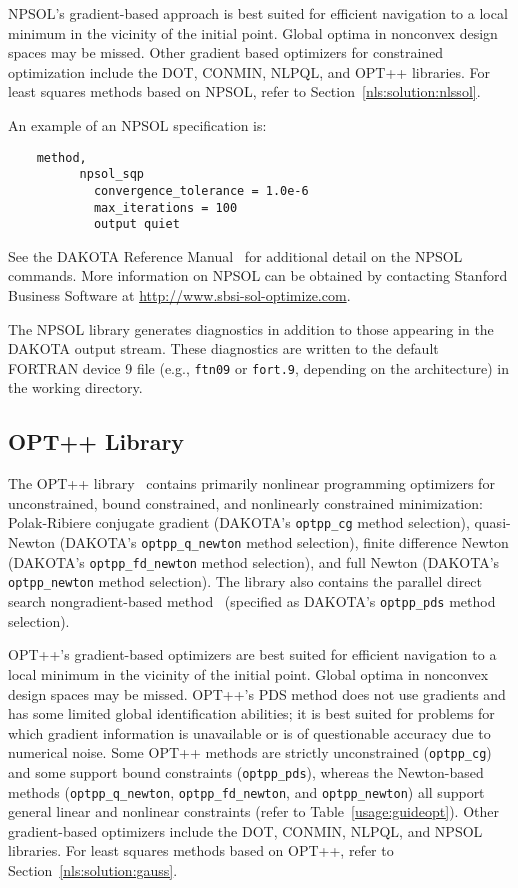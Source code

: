 NPSOL's gradient-based approach is best suited for efficient
navigation to a local minimum in the vicinity of the initial point.
Global optima in nonconvex design spaces may be missed. Other gradient
based optimizers for constrained optimization include the DOT, CONMIN,
NLPQL, and OPT++ libraries. For least squares methods based on NPSOL,
refer to Section~\ref{nls:solution:nlssol}.

An example of an NPSOL specification is:
\begin{small}
\begin{verbatim}
    method,
          npsol_sqp
            convergence_tolerance = 1.0e-6
            max_iterations = 100
            output quiet
\end{verbatim}
\end{small}

See the DAKOTA Reference Manual~\cite{RefMan} for additional detail on the
NPSOL commands. More information on NPSOL can be obtained by
contacting Stanford Business Software at \url{http://www.sbsi-sol-optimize.com}.

The NPSOL library generates diagnostics in addition to those appearing
in the DAKOTA output stream. These diagnostics are written to the
default FORTRAN device 9 file (e.g., \texttt{ftn09} or \texttt{fort.9},
depending on the architecture) in the working directory.

\subsection{OPT++ Library}\label{opt:software:optpp}

The OPT++ library~\cite{MeOlHoWi07} contains primarily nonlinear programming
optimizers for unconstrained, bound constrained, and nonlinearly
constrained minimization: Polak-Ribiere conjugate gradient (DAKOTA's
\texttt{optpp\_cg} method selection), quasi-Newton (DAKOTA's
\texttt{optpp\_q\_newton} method selection), finite difference Newton
(DAKOTA's \texttt{optpp\_fd\_newton} method selection), and full
Newton (DAKOTA's \texttt{optpp\_newton} method selection). The library
also contains the parallel direct search nongradient-based
method~\cite{Den94b} (specified as DAKOTA's \texttt{optpp\_pds} method
selection).

OPT++'s gradient-based optimizers are best suited for efficient
navigation to a local minimum in the vicinity of the initial point.
Global optima in nonconvex design spaces may be missed. OPT++'s PDS
method does not use gradients and has some limited global
identification abilities; it is best suited for problems for which
gradient information is unavailable or is of questionable accuracy due
to numerical noise. Some OPT++ methods are strictly unconstrained
(\texttt{optpp\_cg}) and some support bound constraints
(\texttt{optpp\_pds}), whereas the Newton-based methods
(\texttt{optpp\_q\_newton}, \texttt{optpp\_fd\_newton}, and
\texttt{optpp\_newton}) all support general linear and nonlinear
constraints (refer to Table~\ref{usage:guideopt}). Other
gradient-based optimizers include the DOT, CONMIN, NLPQL, and NPSOL
libraries. For least squares methods based on OPT++, refer to
Section~\ref{nls:solution:gauss}.

